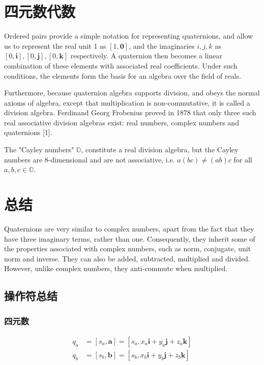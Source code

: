 \section{四元数代数}
Ordered pairs provide a simple notation for representing quaternions, and allow us to represent the real unit 1 as $[1, \mathbf{0}]$, and the imaginaries $i, j, k$ as $[0, \mathbf{i}],[0, \mathbf{j}],[0, \mathbf{k}]$ respectively. A quaternion then becomes a linear combination of these elements with associated real coefficients. Under such conditions, the elements form the basis for an algebra over the field of reals.

Furthermore, because quaternion algebra supports division, and obeys the normal axioms of algebra, except that multiplication is non-commutative, it is called a division algebra. Ferdinand Georg Frobenius proved in 1878 that only three such real associative division algebras exist: real numbers, complex numbers and quaternions [1].

The "Cayley numbers" $\mathbb{O}$, constitute a real division algebra, but the Cayley numbers are 8-dimensional and are not associative, i.e. $a(b c) \neq(a b) c$ for all $a, b, c \in \mathbb{O}$.

\section{总结}
Quaternions are very similar to complex numbers, apart from the fact that they have three imaginary terms, rather than one. Consequently, they inherit some of the properties associated with complex numbers, such as norm, conjugate, unit norm and inverse. They can also be added, subtracted, multiplied and divided. However, unlike complex numbers, they anti-commute when multiplied.

\subsection{操作符总结}
\subsubsection*{四元数}
$$
\begin{aligned}
q_{a} & =\left[s_{a}, \mathbf{a}\right]=\left[s_{a}, x_{a} \mathbf{i}+y_{a} \mathbf{j}+z_{a} \mathbf{k}\right] \\
q_{b} & =\left[s_{b}, \mathbf{b}\right]=\left[s_{b}, x_{b} \mathbf{i}+y_{b} \mathbf{j}+z_{b} \mathbf{k}\right]
\end{aligned}
$$

